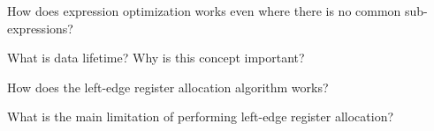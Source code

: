 \begin{Exercise}
How does expression optimization works even where there is no common sub-expressions?
\end{Exercise}

\begin{Exercise}[difficulty=1]
What is data lifetime? Why is this concept important?
\end{Exercise}

\begin{Exercise}
How does the left-edge register allocation algorithm works?
\end{Exercise}

\begin{Exercise}
What is the main limitation of performing left-edge register allocation?
\end{Exercise}